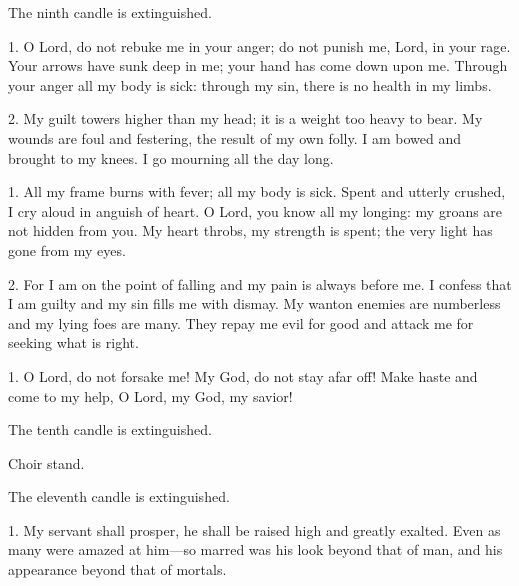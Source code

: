 \begin{rubric}
  The ninth candle is extinguished.
\end{rubric}




1. O Lord, do not rebuke me in your anger; do not punish me, Lord, in your
rage. Your arrows have sunk deep in me; your hand has come down upon me.
Through your anger all my body is sick: through my sin, there is no health in
my limbs.

2. My guilt towers higher than my head; it is a weight too heavy to bear. My
wounds are foul and festering, the result of my own folly. I am bowed and
brought to my knees. I go mourning all the day long.

1. All my frame burns with fever; all my body is sick. Spent and utterly
crushed, I cry aloud in anguish of heart. O Lord, you know all my longing: my
groans are not hidden from you. My heart throbs, my strength is spent; the very
light has gone from my eyes.

2. For I am on the point of falling and my pain is always before me. I confess
that I am guilty and my sin fills me with dismay. My wanton enemies are
numberless and my lying foes are many. They repay me evil for good and attack
me for seeking what is right.

1. O Lord, do not forsake me! My God, do not stay afar off! Make haste and come
to my help, O Lord, my God, my savior!

\begin{rubric}
  The tenth candle is extinguished.
\end{rubric}


\begin{rubric}
  Choir stand.
\end{rubric}



\begin{rubric}
  The eleventh candle is extinguished.
\end{rubric}


1. My servant shall prosper, he shall be raised high and greatly exalted. Even
as many were amazed at him---so marred was his look beyond that of man, and his
appearance beyond that of mortals.

